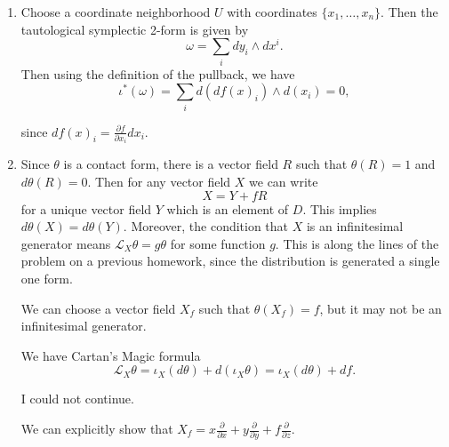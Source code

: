 \documentclass[11pt, reqno]{article}
\theoremstyle{plain}
\theoremstyle{definition}
\theoremstyle{remark}
\begin{document}
\begin{enumerate}
    \item[4.] Choose a coordinate neighborhood $U$ with coordinates $\{x_1, \dots, x_n\}$.
    Then the tautological symplectic 2-form is given by
    \[
        \omega = \sum_i dy_i \wedge dx^i.
    \]
    Then using the definition of the pullback, we have
    \[
        \iota^*(\omega) = \sum_i d(df(x)_i)\wedge d(x_i) = 0,
    \]

    since $df(x)_i = \frac{\partial f}{\partial x_i} dx_i$.

    \item[5.] Since $\theta$ is a contact form, there is a vector field $R$ such that 
    $\theta(R) = 1$ and $d\theta(R) = 0$. Then for any vector field $X$ we can write
    \[
        X = Y + fR
    \] 
    for a unique vector field $Y$ which is an element of $D$. This implies $d\theta(X) = d\theta(Y)$.
    Moreover, the condition that $X$ is an infinitesimal generator means 
    $\mathcal{L}_X\theta = g\theta$ for some function $g$. This is along the lines of the problem
    on a previous homework, since the distribution is generated a single one form. 

    We can choose a vector field $X_f$ such that $\theta(X_f) = f$, but it may not be
    an infinitesimal generator. 
    
    We have Cartan's Magic formula
    \[
        \mathcal{L}_X\theta = \iota_X(d\theta) + d(\iota_X\theta) = \iota_X(d\theta) + df.
    \]

    I could not continue.

    We can explicitly show that $X_f = x\frac{\partial}{\partial x} + y\frac{\partial}{\partial y} + f
    \frac{\partial}{\partial z}$.

    
\end{enumerate}
\end{document}
